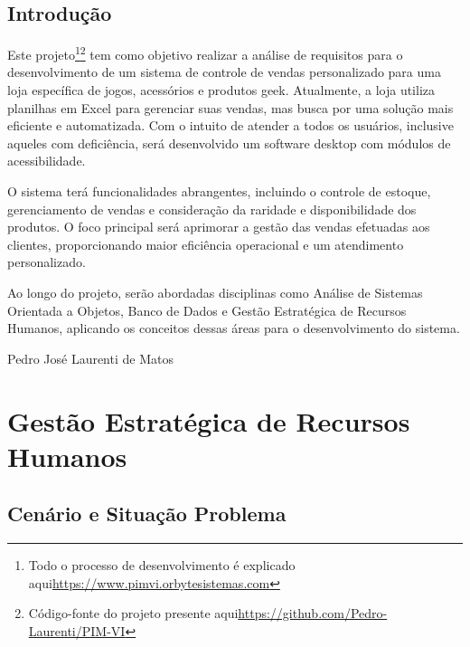 \documentclass[
	12pt,				%
	openright,			%
	twoside,			%
	a4paper,			%
	english,			%
	brazil				%
	]{abntex2}
\begin{document}
\chapter{Introdução}

Este projeto\footnote{Todo o processo de desenvolvimento é explicado aqui\url{https://www.pimvi.orbytesistemas.com}}\footnote{Código-fonte do projeto presente aqui\url{https://github.com/Pedro-Laurenti/PIM-VI}} tem como objetivo realizar a análise de requisitos para o desenvolvimento de um sistema de controle de vendas personalizado para uma loja específica de jogos, acessórios e produtos geek. Atualmente, a loja utiliza planilhas em Excel para gerenciar suas vendas, mas busca por uma solução mais eficiente e automatizada. Com o intuito de atender a todos os usuários, inclusive aqueles com deficiência, será desenvolvido um software desktop com módulos de acessibilidade.

O sistema terá funcionalidades abrangentes, incluindo o controle de estoque, gerenciamento de vendas e consideração da raridade e disponibilidade dos produtos. O foco principal será aprimorar a gestão das vendas efetuadas aos clientes, proporcionando maior eficiência operacional e um atendimento personalizado.

Ao longo do projeto, serão abordadas disciplinas como Análise de Sistemas Orientada a Objetos, Banco de Dados e Gestão Estratégica de Recursos Humanos, aplicando os conceitos dessas áreas para o desenvolvimento do sistema.

Pedro José Laurenti de Matos

\part{Gestão Estratégica de Recursos Humanos}



\chapter{Cenário e Situação Problema}\label{ident_cenar_problem}
\end{document}
